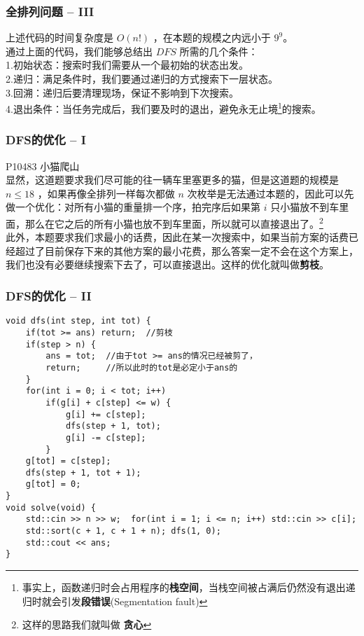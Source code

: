 \documentclass{beamer}
\newcommand{\fdf}[1]{\alert{\textbf{#1}}}
\begin{document}
\begin{frame}
\frametitle{全排列问题 -- III}
上述代码的时间复杂度是 $O(n!)$ ，在本题的规模之内远小于 $9^9$。\\ 
通过上面的代码，我们能够总结出 $DFS$ 所需的几个条件：\\ 
1.初始状态：搜索时我们需要从一个最初始的状态出发。\\ 
2.递归：满足条件时，我们要通过递归的方式搜索下一层状态。\\ 
3.回溯：递归后要清理现场，保证不影响到下次搜索。\\ 
4.退出条件：当任务完成后，我们要及时的退出，避免永无止境\footnote{事实上，函数递归时会占用程序的\fdf{栈空间}，当栈空间被占满后仍然没有退出递归时就会引发\fdf{段错误}(Segmentation fault)}的搜索。
\end{frame}
\begin{frame}
\frametitle{DFS的优化 -- I}
P10483 小猫爬山\\
显然，这道题要求我们尽可能的往一辆车里塞更多的猫，但是这道题的规模是 $n \leq 18$ ，如果再像全排列一样每次都做 $n$ 次枚举是无法通过本题的，因此可以先做一个优化：对所有小猫的重量排一个序，拍完序后如果第 $i$ 只小猫放不到车里面，那么在它之后的所有小猫也放不到车里面，所以就可以直接退出了。\footnote{这样的思路我们就叫做 \fdf{贪心}} \\ 
此外，本题要求我们求最小的话费，因此在某一次搜索中，如果当前方案的话费已经超过了目前保存下来的其他方案的最小花费，那么答案一定不会在这个方案上，我们也没有必要继续搜索下去了，可以直接退出。这样的优化就叫做\fdf{剪枝}。
\end{frame}
\begin{frame}[fragile]
\frametitle{DFS的优化 -- II}
\begin{onlyenv}
\begin{verbatim}
void dfs(int step, int tot) {
    if(tot >= ans) return;  //剪枝
    if(step > n) {
        ans = tot;  //由于tot >= ans的情况已经被剪了，
        return;     //所以此时的tot是必定小于ans的
    }
    for(int i = 0; i < tot; i++)
        if(g[i] + c[step] <= w) {
            g[i] += c[step];
            dfs(step + 1, tot);
            g[i] -= c[step];
        }
    g[tot] = c[step];
    dfs(step + 1, tot + 1);
    g[tot] = 0;
}
void solve(void) {
    std::cin >> n >> w;  for(int i = 1; i <= n; i++) std::cin >> c[i];
    std::sort(c + 1, c + 1 + n); dfs(1, 0);
    std::cout << ans;
}
\end{verbatim}
\end{onlyenv}
\end{frame}
\end{document}
